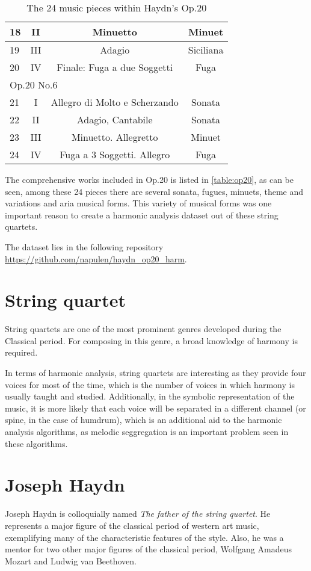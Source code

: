 \begin{table}[tbp]
\begin{tabular}{|l|c|c|c|}
18 & II & Minuetto & Minuet \\ \hline
19 & III & Adagio & Siciliana \\ \hline
20 & IV & Finale: Fuga a due Soggetti & Fuga \\ \hline
\multicolumn{4}{|l|}{Op.20 No.6} \\ \hline
21 & I & Allegro di Molto e Scherzando & Sonata \\ \hline
22 & II & Adagio, Cantabile & Sonata \\ \hline
23 & III & Minuetto. Allegretto & Minuet \\ \hline
24 & IV & Fuga a 3 Soggetti. Allegro & Fuga \\ \hline
\end{tabular}
\caption{The 24 music pieces within Haydn's Op.20}
\label{table:op20}
\end{table}

The comprehensive works included in Op.20 is listed in \autoref{table:op20}, as can be seen, among these 24 pieces there are several sonata, fugues, minuets, theme and variations and aria musical forms. This variety of musical forms was one important reason to create a harmonic analysis dataset out of these string quartets.

The dataset lies in the following repository \url{https://github.com/napulen/haydn_op20_harm}.

\section{String quartet}
String quartets are one of the most prominent genres developed during the Classical period. For composing in this genre, a broad knowledge of harmony is required.

In terms of harmonic analysis, string quartets are interesting as they provide four voices for most of the time, which is the number of voices in which harmony is usually taught and studied. Additionally, in the symbolic representation of the music, it is more likely that each voice will be separated in a different channel (or spine, in the case of humdrum), which is an additional aid to the harmonic analysis algorithms, as melodic seggregation is an important problem seen in these algorithms.

\section{Joseph Haydn}
Joseph Haydn is colloquially named \emph{The father of the string quartet}. He represents a major figure of the classical period of western art music,
exemplifying many of the characteristic features of the style. Also, he was a mentor for two other major figures of the classical period, Wolfgang Amadeus Mozart and Ludwig van Beethoven.

